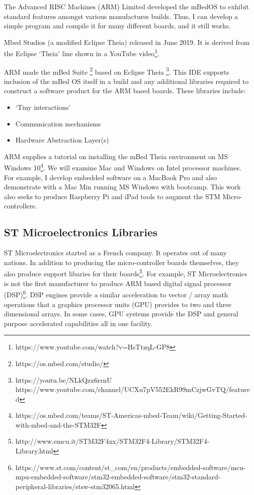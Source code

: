 \documentclass{article}
\begin{document}
The Advanced RISC Machines (ARM) Limited developed the mBedOS to exhibit standard features amongst various manufactures builds.  Thus, I can develop a simple program and compile it for many different boards, and it still works. 

Mbed Studios (a modified Eclipse Theia) released in June 2019.  It is derived from the Eclipse `Theia' line shown in a YouTube video\footnote{https://www.youtube.com/watch?v=HsTtzqL-GP8}.

ARM made the mBed Suite \footnote{https://os.mbed.com/studio/} based on Eclipse Theia  \footnote{https://youtu.be/NLkQzx6rrnU \\https://www.youtube.com/channel/UCXu7pV552EkR99mCzjwGvTQ/featured}.  This IDE supports inclusion of the mBed OS itself in a build and any additional libraries required to construct a software product for the ARM based boards.  These libraries include:
\begin{itemize}
	\item `Tiny interactions'
	\item Communication mechanisms
	\item Hardware Abstraction Layer(s)
\end{itemize}



ARM supplies a tutorial on installing the mBed Theia environment on MS Windows 10\footnote{https://os.mbed.com/teams/ST-Americas-mbed-Team/wiki/Getting-Started-with-mbed-and-the-STM32F}.  We will examine Mac and Windows on Intel processor machines.   For example, I develop embedded software on a MacBook Pro and also demonstrate with a Mac Min running MS Windows with bootcamp.  This work also seeks to produce Raspberry Pi and iPad tools to augment the STM Micro-controllers.  %


\subsection{ST Microelectronics Libraries} %
\label{sub:st_microelectronics_libraries}

ST Microelectronics started as a French company.  It operates out of many nations.  In addition to producing the micro-controller boards themselves, they also produce support libaries for their boards\footnote{http://www.emcu.it/STM32F4xx/STM32F4-Library/STM32F4-Library.html}.  For example, ST Microelectronics is not the first manufacturer to produce ARM based digital signal processor (DSP)\footnote{https://www.st.com/content/st\_com/en/products/embedded-software/mcu-mpu-embedded-software/stm32-embedded-software/stm32-standard-peripheral-libraries/stsw-stm32065.html}.  DSP engines provide a similar acceleration to vector / array math operations that a graphics processor units (GPU) provides to two and three dimensional arrays.   In some cases, GPU systems provide the DSP and general purpose accelerated capabilities all in one facility. 
\end{document}
